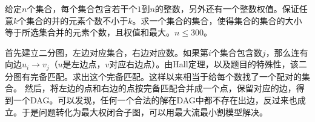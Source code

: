 \begin{prob}
	给定$n$个集合，每个集合包含若干个$1$到$n$的整数，另外还有一个整数权值。保证任意$k$个集合的并的元素个数不小于$k$。求一个集合的集合，使得集合的集合的大小等于所选集合并的元素个数，且权值和最大。$n \le 300$。
\end{prob}

\begin{sol}
	首先建立二分图，左边对应集合，右边对应数。如果第$i$个集合包含数$j$，那么连有向边$u_i \to v_j$（$u$是左边点，$v$对应右边点）。由Hall定理，以及题目的特殊性，该二分图有完备匹配。求出这个完备匹配。这样以来相当于给每个数找了一个配对的集合。
	然后，将左边的点和右边的点按完备匹配合并成一个点，保留对应的边，得到一个DAG。可以发现，任何一个合法的解在DAG中都不存在出边，反过来也成立。于是问题转化为最大权闭合子图，可以用最大流最小割模型解决。
\end{sol}
